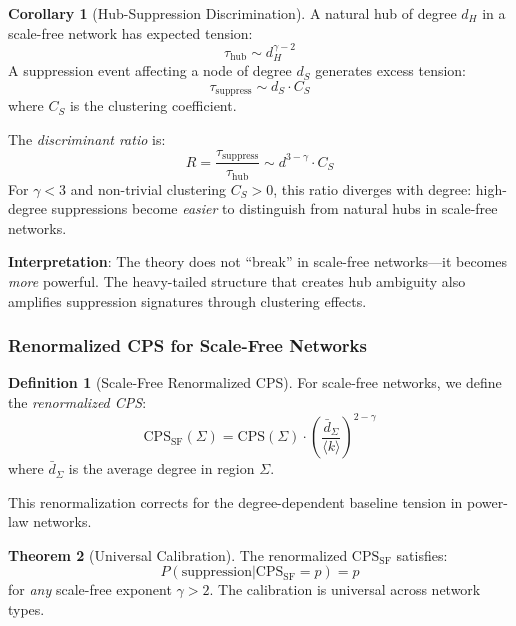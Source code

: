 \documentclass[12pt,a4paper]{article}
\theoremstyle{definition}
\newtheorem{definition}{Definition}[section]
\newtheorem{theorem}{Theorem}[section]
\newtheorem{corollary}[theorem]{Corollary}
\theoremstyle{remark}
\begin{document}
\begin{corollary}[Hub-Suppression Discrimination]
\label{cor:hub-discrim}
A natural hub of degree $d_H$ in a scale-free network has expected tension:
\begin{equation}
    \tau_{\text{hub}} \sim d_H^{\gamma - 2}
\end{equation}
A suppression event affecting a node of degree $d_S$ generates excess tension:
\begin{equation}
    \tau_{\text{suppress}} \sim d_S \cdot C_S
\end{equation}
where $C_S$ is the clustering coefficient.

The \emph{discriminant ratio} is:
\begin{equation}
    \boxed{
    R = \frac{\tau_{\text{suppress}}}{\tau_{\text{hub}}} \sim d^{3 - \gamma} \cdot C_S
    }
\end{equation}
For $\gamma < 3$ and non-trivial clustering $C_S > 0$, this ratio diverges with degree: high-degree suppressions become \emph{easier} to distinguish from natural hubs in scale-free networks.
\end{corollary}

\textbf{Interpretation}: The theory does not ``break'' in scale-free networks—it becomes \emph{more} powerful. The heavy-tailed structure that creates hub ambiguity also amplifies suppression signatures through clustering effects.

\subsubsection{Renormalized CPS for Scale-Free Networks}

\begin{definition}[Scale-Free Renormalized CPS]
For scale-free networks, we define the \emph{renormalized CPS}:
\begin{equation}
    \boxed{
    \text{CPS}_{\text{SF}}(\Sigma) = \text{CPS}(\Sigma) \cdot \left( \frac{\bar{d}_\Sigma}{\langle k \rangle} \right)^{2 - \gamma}
    }
\end{equation}
where $\bar{d}_\Sigma$ is the average degree in region $\Sigma$.

This renormalization corrects for the degree-dependent baseline tension in power-law networks.
\end{definition}

\begin{theorem}[Universal Calibration]
\label{thm:universal-calib}
The renormalized $\text{CPS}_{\text{SF}}$ satisfies:
\begin{equation}
    P(\text{suppression} | \text{CPS}_{\text{SF}} = p) = p
\end{equation}
for \emph{any} scale-free exponent $\gamma > 2$. The calibration is universal across network types.
\end{theorem}
\end{document}
